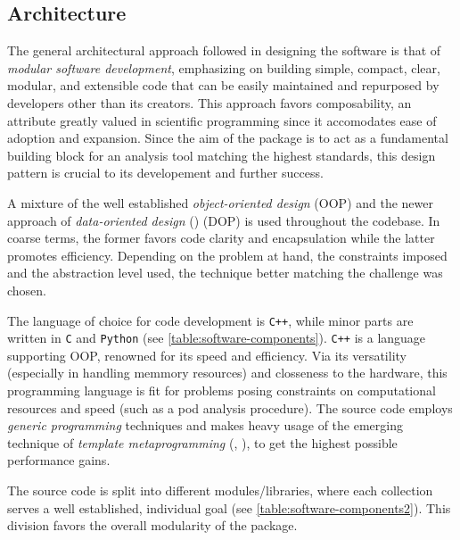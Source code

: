 \subsection{Architecture}\label{sec:the-software-architecture}
The general architectural approach followed in designing the software is that of 
\emph{modular software development}, emphasizing on building simple, compact, 
clear, modular, and extensible code that can be easily maintained and repurposed 
by developers other than its creators. This approach favors composability, an attribute 
greatly valued in scientific programming since it accomodates ease of adoption and 
expansion. Since the aim of the package is to act as a fundamental building block 
for an analysis tool matching the highest standards, this design pattern is crucial 
to its developement and further success.

A mixture of the well established \emph{object-oriented design} (OOP) and the 
newer approach of \emph{data-oriented design} (\cite{Fabian2018}) (DOP) is used 
throughout the codebase. In coarse terms, the former favors code clarity and 
encapsulation while the latter promotes efficiency. Depending on the problem at 
hand, the constraints imposed and the abstraction level used, the technique better 
matching the challenge was chosen.

The language of choice for code development is \texttt{C++}, while minor parts 
are written in \texttt{C} and \texttt{Python} (see \autoref{table:software-components}). 
\texttt{C++} is a language supporting OOP, renowned for its speed and efficiency. 
Via its versatility (especially in handling memmory resources) and closseness to 
the hardware, this programming language is fit for problems posing constraints on 
computational resources and speed (such as a \gls{pod} analysis procedure). The source 
code employs \emph{generic programming} techniques and makes heavy usage of the 
emerging technique of \emph{template metaprogramming} (\cite{Esterie2014}, 
\cite{Gawlik2018}), to get the highest possible performance gains.

The source code is split into different modules/libraries, where each collection 
serves a well established, individual goal (see \autoref{table:software-components2}). 
This division favors the overall modularity of the package.


